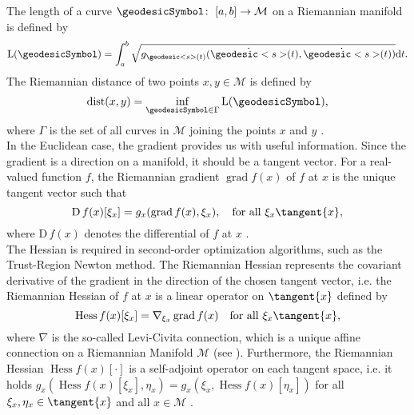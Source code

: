 The length of a curve $\geodesicSymbol \colon \; [a,b] \to \mathcal{M}$ on a Riemannian manifold is defined by
\begin{equation*}
    \mathrm{L}(\geodesicSymbol) = \int^{b}_a \sqrt{ g_{\geodesic<s>(t)} (\dot{\geodesic<s>}(t), \dot{\geodesic<s>}(t)) } \mathrm{d}t.
\end{equation*}
The Riemannian distance of two points $x,y \in \mathcal{M}$ is defined by
\begin{equation*}
    \operatorname{dist}(x,y) = \inf_{\geodesicSymbol \in \Gamma} \mathrm{L}(\geodesicSymbol),
\end{equation*}
where $\Gamma$ is the set of all curves in $\mathcal{M}$ joining the points $x$ and $y$ \cite[p.~46]{AbsilMahonySepulchre:2008}. \\
In the Euclidean case, the gradient provides us with useful information. Since the gradient is a direction on a manifold, it should be a tangent vector. For a real-valued function $f$, the Riemannian gradient $\operatorname{grad} f(x)$ of $f$ at $x$ is the unique tangent vector such that
\begin{equation*}
    \mathrm{D} \, f(x) [\xi_x] = g_x (\operatorname{grad} f(x), \xi_x), \quad \text{for all } \xi_x \tangent{x},
\end{equation*}
where $\mathrm{D} \, f(x)$ denotes the differential of $f$ at $x$ \cite[p.~46]{AbsilMahonySepulchre:2008}. \\
The Hessian is required in second-order optimization algorithms, such as the Trust-Region Newton method. The Riemannian Hessian represents the covariant derivative of the gradient in the direction of the chosen tangent vector, i.e. the Riemannian Hessian of $f$ at $x$ is a linear operator on $\tangent{x}$ defined by
\begin{equation*}
    \operatorname{Hess} f(x) [\xi_{x}] = \nabla_{\xi_{x}} \operatorname{grad} f(x) \quad \text{for all } \xi_x \tangent{x},
\end{equation*}
where $\nabla$ is the so-called Levi-Civita connection, which is a unique affine connection on a Riemannian Manifold $\mathcal{M}$ (see \cite[Theorem~5.3.1~(Levi-Civita)]{AbsilMahonySepulchre:2008}). Furthermore, the Riemannian Hessian $\operatorname{Hess} f(x) [\cdot]$ is a self-adjoint operator on each tangent space, i.e. it holds $g_x(\operatorname{Hess} f(x) [\xi_{x}], \eta_x) = g_x(\xi_{x}, \operatorname{Hess} f(x) [\eta_x])$ for all $\xi_x, \eta_x \in \tangent{x}$ and all $x \in \mathcal{M}$ \cite[p.~105]{AbsilMahonySepulchre:2008}. \\
